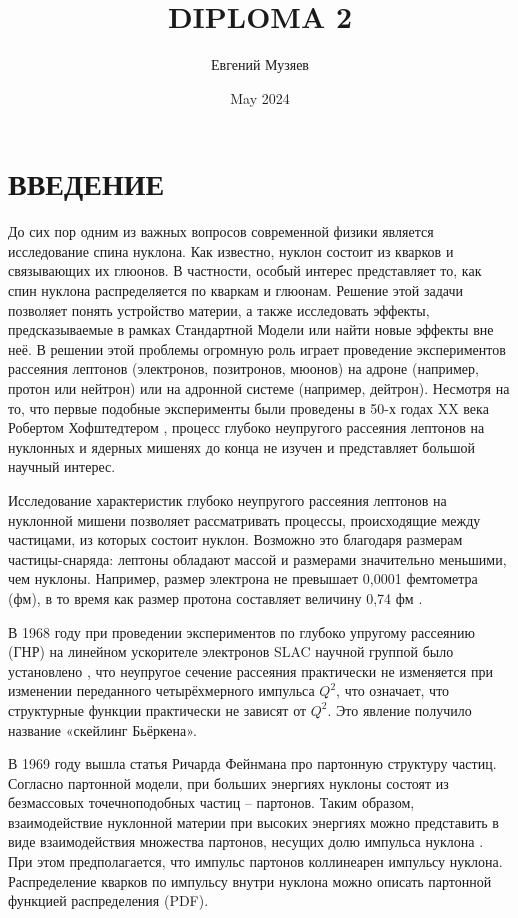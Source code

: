 \documentclass{extreport}
\title{DIPLOMA 2}
\author{Евгений Музяев}
\date{May
 2024}
\begin{document}



\newpage
\setcounter{page}{4}
\tableofcontents



\newpage


\chapter*{\MakeUppercase{Введение}}
\thispagestyle{headings}

До сих пор одним из важных вопросов современной физики является исследование спина нуклона. Как известно, нуклон состоит из кварков и связывающих их глюонов. В частности, особый интерес представляет то, как спин нуклона распределяется по кваркам и глюонам. Решение этой задачи позволяет понять устройство материи, а также исследовать эффекты, предсказываемые в рамках Стандартной Модели или найти новые эффекты вне неё. В решении этой проблемы огромную роль играет проведение экспериментов рассеяния лептонов (электронов, позитронов, мюонов) на адроне (например, протон или нейтрон) или на адронной системе (например, дейтрон). Несмотря на то, что первые подобные эксперименты были проведены в 50-х годах XX века Робертом Хофштедтером \cite{Hofstadter}, процесс глубоко неупругого рассеяния лептонов на нуклонных и ядерных мишенях до конца не изучен и представляет большой научный интерес.


Исследование характеристик глубоко неупругого рассеяния лептонов на нуклонной мишени позволяет рассматривать процессы, происходящие между частицами, из которых состоит нуклон. Возможно это благодаря размерам частицы-снаряда: лептоны обладают массой и размерами значительно меньшими, чем нуклоны. Например, размер электрона не превышает 0,0001 фемтометра (фм), в то время как размер протона составляет величину 0,74 фм \cite{Hofstadter}.


В 1968 году при проведении экспериментов по глубоко упругому рассеянию (ГНР) на линейном ускорителе электронов SLAC научной группой было установлено \cite{SLAC}, что неупругое сечение рассеяния практически не изменяется при изменении переданного четырёхмерного импульса $Q^2$, что означает, что структурные функции практически не зависят от $Q^2$. Это явление получило название «скейлинг Бьёркена».


В 1969 году вышла статья Ричарда Фейнмана про партонную структуру частиц. Согласно партонной модели, при больших энергиях нуклоны состоят из безмассовых точечноподобных частиц – партонов. Таким образом, взаимодействие нуклонной материи при высоких энергиях можно представить в виде взаимодействия множества партонов, несущих долю импульса нуклона \cite{Feynman}. При этом предполагается, что импульс партонов коллинеарен импульсу нуклона. Распределение кварков по импульсу внутри нуклона можно описать партонной функцией распределения (PDF).
\end{document}
